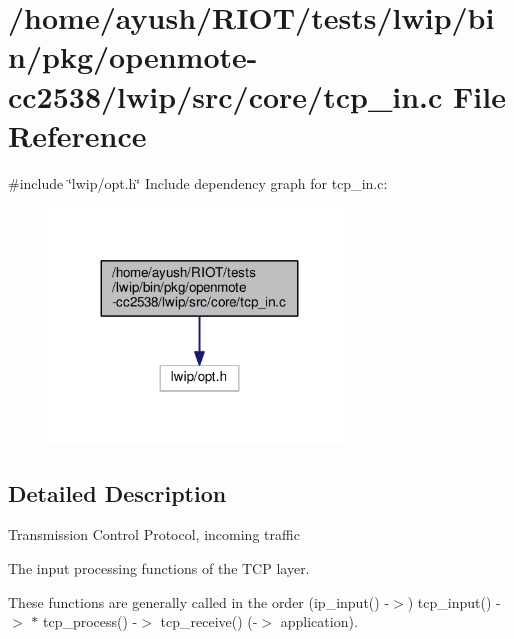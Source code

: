 \hypertarget{openmote-cc2538_2lwip_2src_2core_2tcp__in_8c}{}\section{/home/ayush/\+R\+I\+O\+T/tests/lwip/bin/pkg/openmote-\/cc2538/lwip/src/core/tcp\+\_\+in.c File Reference}
\label{openmote-cc2538_2lwip_2src_2core_2tcp__in_8c}
{\ttfamily \#include \char`\"{}lwip/opt.\+h\char`\"{}}\newline
Include dependency graph for tcp\+\_\+in.\+c\+:
\nopagebreak
\begin{figure}[H]
\begin{center}
\leavevmode
\includegraphics[width=227pt]{openmote-cc2538_2lwip_2src_2core_2tcp__in_8c__incl}
\end{center}
\end{figure}


\subsection{Detailed Description}
Transmission Control Protocol, incoming traffic

The input processing functions of the T\+CP layer.

These functions are generally called in the order (ip\+\_\+input() -\/$>$) tcp\+\_\+input() -\/$>$ $\ast$ tcp\+\_\+process() -\/$>$ tcp\+\_\+receive() (-\/$>$ application). 